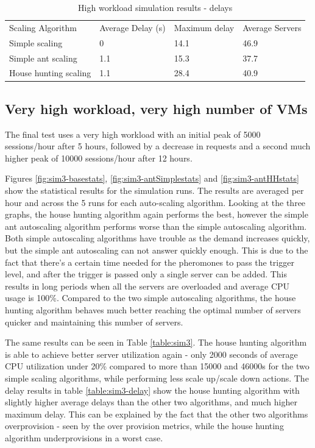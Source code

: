 \documentclass[conference]{IEEEtran}
\begin{document}
\begin{table}
\caption{High workload simulation results - delays}
\label{table:sim2-delay}
\begin{tabu} to\linewidth{|X[c]|X[c]|X[c]|X[c]|}
\everyrow{\hline}
\hline
Scaling Algorithm & Average Delay (s) & Maximum delay & Average Servers  \\
Simple scaling & 0 & 14.1 & 46.9 \\
Simple ant scaling & 1.1 & 15.3 & 37.7 \\
House hunting scaling & 1.1 & 28.4 & 40.9 \\
\end{tabu}
\end{table}

\subsection{Very high workload, very high number of VMs}

The final test uses a very high workload with an initial peak of 5000 sessions/hour after 5 hours, followed by a decrease in requests and a second much higher peak of 10000 sessions/hour after 12 hours.

Figures \ref{fig:sim3-basestats}, \ref{fig:sim3-antSimplestats} and \ref{fig:sim3-antHHstats} show the statistical results for the simulation runs. The results are averaged per hour and across the 5 runs for each auto-scaling algorithm. Looking at the three graphs, the house hunting algorithm again performs the best, however the simple ant autoscaling algorithm performs worse than the simple autoscaling algorithm. Both simple autoscaling algorithms have trouble as the demand increases quickly, but the simple ant autoscaling can not answer quickly enough. This is due to the fact that there's a certain time needed for the pheromones to pass the trigger level, and after the trigger is passed only a single server can be added. This results in long periods when all the servers are overloaded and average CPU usage is 100\%. Compared to the two simple autoscaling algorithms, the house hunting algorithm behaves much better reaching the optimal number of servers quicker and maintaining this number of servers.

The same results can be seen in Table \ref{table:sim3}. The house hunting algorithm is able to achieve better server utilization again - only 2000 seconds of average CPU utilization under 20\% compared to more than 15000 and 46000s for the two simple scaling algorithms, while performing less scale up/scale down actions.  The delay results in table \ref{table:sim3-delay} show the house hunting algorithm with slightly higher average delays than the other two algorithms, and much higher maximum delay. This can be explained by the fact that the other two algorithms overprovision - seen by the over provision metrics, while the house hunting algorithm underprovisions in a worst case.
\end{document}
